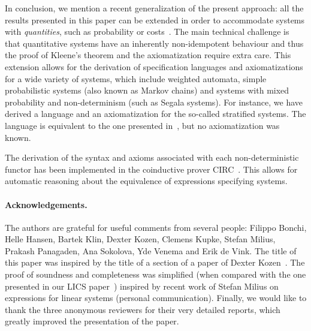 \documentclass{LMCS}
\theoremstyle{definition}
\theoremstyle{plain}
\theoremstyle{plain}
\theoremstyle{plain}
\theoremstyle{plain}
\theoremstyle{definition}
\theoremstyle{definition}
\begin{document}
In conclusion, we mention a recent generalization of the present
approach: all the results presented in this paper can be extended in order to accommodate systems with \emph{quantities}, such as probability or costs~\cite{BBRS09}. The main
technical challenge
is that quantitative systems have an inherently non-idempotent
behaviour and thus the proof of Kleene's theorem and the
axiomatization require extra care. This extension allows for the derivation of specification languages and axiomatizations for a wide variety of systems, which include weighted automata, simple probabilistic systems (also known as Markov chains) and systems with mixed probability and non-determinism (such as Segala systems). For instance, we have derived a language and an axiomatization for the so-called stratified systems. The language is equivalent to the one presented in~\cite{GSS95}, but no axiomatization was known. 

The derivation of the syntax and axioms associated with each non-deterministic functor has been implemented in the coinductive prover CIRC~\cite{circ}. This allows for automatic reasoning about the equivalence of expressions specifying  systems. 

\paragraph{\textbf{Acknowledgements.}} The authors are grateful for useful
comments from several people: Filippo Bonchi, Helle Hansen, Bartek
Klin, Dexter Kozen, Clemens Kupke, Stefan Milius, Prakash Panagaden,
Ana Sokolova, Yde Venema and Erik de Vink.  The title of this paper
was inspired by the title of a section of a paper of Dexter
Kozen~\cite{kozen08}. The proof of soundness and completeness was
simplified (when compared with the one presented in our LICS
paper~\cite{BRS09b}) inspired by recent work of Stefan Milius on
expressions for linear systems (personal communication). Finally, we
would like to thank the three anonymous reviewers for their very detailed
reports, which greatly improved the presentation of the paper.\vspace{-24 pt}



\vspace{-20 pt}
\end{document}
